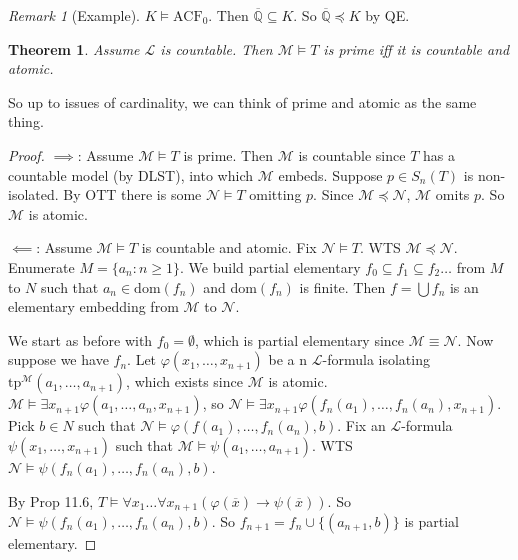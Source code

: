 \documentclass[]{article}
\theoremstyle{custhm}
\newtheorem{theorem}{Theorem}[section]
\theoremstyle{cusdef}
\theoremstyle{custhm}
\theoremstyle{custhm}
\theoremstyle{custhm}
\theoremstyle{ex}
\theoremstyle{custhm}
\theoremstyle{cusdef}
\theoremstyle{remark}
\newtheorem*{remark*}{Remark}
\theoremstyle{remark}
\theoremstyle{numremark}
\newcommand{\Q}{\mathbb{Q}}
\newcommand{\ra}{\rightarrow}
\renewcommand{\L}{\mathcal{L}}
\newcommand{\M}{\mathcal{M}}
\renewcommand{\phi}{\varphi}
\renewcommand{\bar}{\overline}
\newcommand{\tp}{\textrm{tp}}
\newcommand{\N}{\mathcal{N}}
\newcommand{\acf}{\textrm{ACF}}
\renewcommand{\subset}{\subseteq}
\begin{document}
\begin{remark*}[Example]
$K\models \acf_0$. Then $\bar{\Q}\subseteq K$. So $\bar{\Q}\preceq K$ by QE.
\end{remark*}
\begin{theorem}
Assume $\L$ is countable. Then $\M\models T$ is prime iff it is countable and atomic.
\end{theorem}
So up to issues of cardinality, we can think of prime and atomic as the same thing.
\begin{proof}
$\implies$: Assume $\M\models T$ is prime. Then $\M$ is countable since $T$ has a countable model (by DLST), into which $\M$ embeds. Suppose $p \in S_n(T)$ is non-isolated. By OTT there is some $\N\models T$ omitting $p$. Since $\M\preceq\N$, $\M$ omits $p$. So $\M$ is atomic.

$\impliedby$: Assume $\M\models T$ is countable and atomic. Fix $\N\models T$. WTS $\M\preceq\N$. Enumerate $M = \{a_n:n\ge 1\}$. We build partial elementary $f_0\subset f_1\subset f_2\dots$ from $M$ to $N$ such that $a_n\in \textrm{dom}(f_n)$ and dom$(f_n)$ is finite. Then $f = \bigcup f_n$ is an elementary embedding from $\M$ to $\N$.

We start as before with $f_0 = \emptyset$, which is partial elementary since $\M\equiv \N$. Now suppose we have $f_n$. Let $\phi(x_1,\dots,x_{n+1})$ be a n $\L$-formula isolating $\tp^\M(a_1,\dots,a_{n+1})$, which exists since $\M$ is atomic. $\M\models \exists x_{n+1}\phi(a_1,\dots,a_n,x_{n+1})$, so $\N\models \exists x_{n+1}\phi(f_n(a_1),\dots,f_n(a_n),x_{n+1})$. Pick $b\in N$ such that $\N\models \phi(f(a_1),\dots,f_n(a_n),b)$. Fix an $\L$-formula $\psi(x_1,\dots,x_{n+1})$ such that $\M\models \psi(a_1,\dots,a_{n+1})$. WTS $\N\models \psi(f_n(a_1),\dots,f_n(a_n),b)$.

By Prop 11.6, $T\models \forall x_1\dots\forall x_{n+1}(\phi(\bar{x})\ra\psi(\bar{x}))$. So $\N\models \psi(f_n(a_1),\dots,f_n(a_n),b)$. So $f_{n+1} = f_n\cup\{(a_{n+1},b)\}$ is partial elementary.
\end{proof}
\end{document}

